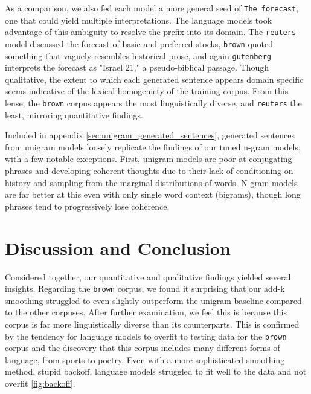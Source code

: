 \documentclass[11pt,a4paper]{article}
\begin{document}
As a comparison, we also fed each model a more general seed of \texttt{The forecast}, one that could yield multiple interpretations. The language models took advantage of this ambiguity to resolve the prefix into its domain. The \texttt{reuters} model discussed the forecast of basic and preferred stocks, \texttt{brown} quoted something that vaguely resembles historical prose, and again \texttt{gutenberg} interprets the forecast as "Israel 21," a pseudo-biblical passage. Though qualitative, the extent to which each generated sentence appears domain specific seems indicative of the lexical homogeniety of the training corpus. From this lense, the \texttt{brown} corpus appears the most linguistically diverse, and \texttt{reuters} the least, mirroring quantitative findings.

Included in appendix \ref{sec:unigram_generated_sentences}, generated sentences from unigram models loosely replicate the findings of our tuned n-gram models, with a few notable exceptions. First, unigram models are poor at conjugating phrases and developing coherent thoughts due to their lack of conditioning on history and sampling from the marginal distributions of words. N-gram models are far better at this even with only single word context (bigrams), though long phrases tend to progressively lose coherence. 


\section{Discussion and Conclusion}%
\label{sec:disc_conclusion}

Considered together, our quantitative and qualitative findings yielded several insights. Regarding the \texttt{brown} corpus, we found it surprising that our add-k smoothing struggled to even slightly outperform the unigram baseline compared to the other corpuses. After further examination, we feel this is because this corpus is far more linguistically diverse than its counterparts. This is confirmed by the tendency for language models to overfit to testing data for the \texttt{brown} corpus and the discovery that this corpus includes many different forms of language, from sports to poetry. Even with a more sophisticated smoothing method, stupid backoff, language models struggled to fit well to the data and not overfit \ref{fig:backoff}. 
\end{document}
